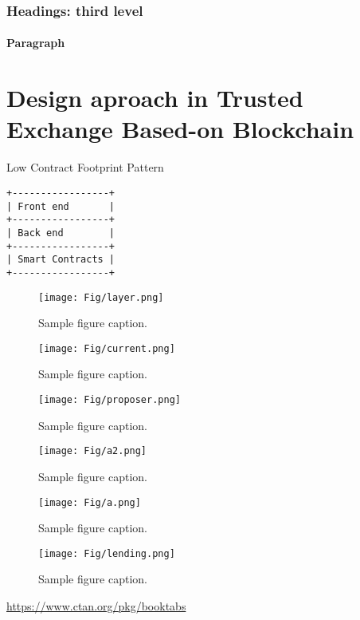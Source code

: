 \documentclass{article}
\begin{document}
\subsubsection{Headings: third level}
\lipsum[6]

\paragraph{Paragraph}
\lipsum[7]

\section{Design aproach in  Trusted Exchange Based-on Blockchain}
\label{sec:others}
Low Contract Footprint Pattern

\begin{lstlisting}
+-----------------+
| Front end       |
+-----------------+
| Back end        |
+-----------------+
| Smart Contracts |
+-----------------+
\end{lstlisting}
\begin{figure}
\centering\texttt{[image: Fig/layer.png]} 
  \caption{Sample figure caption.}
\label{fig:fourchamber}\end{figure} 
\begin{figure}
\centering\texttt{[image: Fig/current.png]} 
  \caption{Sample figure caption.}
\label{fig:fourchamber}\end{figure} 
\begin{figure}
\centering\texttt{[image: Fig/proposer.png]} 
  \caption{Sample figure caption.}
\label{fig:fourchamber}\end{figure} 
\begin{figure}
\centering\texttt{[image: Fig/a2.png]} 
  \caption{Sample figure caption.}
\label{fig:fourchamber}\end{figure} 
\begin{figure}
\centering\texttt{[image: Fig/a.png]} 
  \caption{Sample figure caption.}
\label{fig:fourchamber}\end{figure} 
\begin{figure}
\centering\texttt{[image: Fig/lending.png]} 
  \caption{Sample figure caption.}
\label{fig:fourchamber}\end{figure} 


\begin{center}
  \url{https://www.ctan.org/pkg/booktabs}
\end{center}
\end{document}
